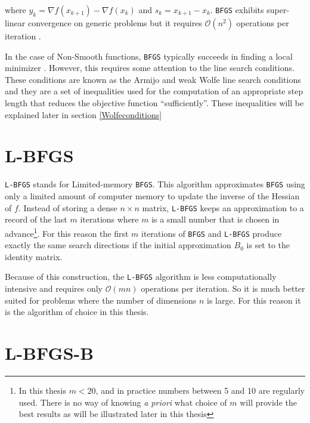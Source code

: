 where $y_k = \nabla f(x_{k+1}) - \nabla f(x_k)$ and $s_k = x_{k+1} - x_k$.  \texttt{BFGS} exhibits super-linear convergence on generic problems but it requires $\mathcal{O}(n^2)$ operations per iteration \citep{nocedal}.

In the case of Non-Smooth functions, \texttt{BFGS} typically succeeds in finding a local minimizer \citep{overtonlewis}. However, this requires some attention to the line search conditions. These conditions are known as the Armijo and weak Wolfe line search conditions and they are a set of inequalities used for the computation of an appropriate step length that reduces the objective function ``sufficiently''. These inequalities will be explained later in section \eqref{Wolfeconditions}

\section{L-BFGS}

\texttt{L-BFGS} stands for Limited-memory \texttt{BFGS}. This algorithm approximates \texttt{BFGS} using only a limited amount of computer memory to update the inverse of the Hessian of $f$. Instead of storing a dense $n \times n$ matrix, \texttt{L-BFGS} keeps an approximation to a record of the last $m$ iterations where $m$ is a small number that is chosen in advance\footnote{In this thesis $m < 20$, and in practice numbers between 5 and 10 are regularly used. There is no way of knowing \emph{a priori} what choice of $m$ will provide the best results as will be illustrated later in this thesis}. For this reason the first $m$ iterations of \texttt{BFGS} and \texttt{L-BFGS} produce exactly the same search directions if the initial approximation $B_0$ is set to the identity matrix.

Because of this construction, the \texttt{L-BFGS} algorithm is less computationally intensive and requires only $\mathcal{O}(mn)$ operations per iteration. So it is much better suited for problems where the number of dimensions $n$ is large. For this reason it is the algorithm of choice in this thesis.

\section{L-BFGS-B}

